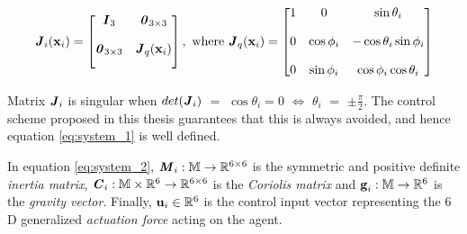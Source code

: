 \begin{equation}
  \bm{\mathit{J}}_i(\bm{\mathbf{x}}_i) =
  \begin{bmatrix}
    \bm{\mathit{I}}_3 & \bm{\mathit{0}}_{3 \times 3} \\[2.5ex]
    \bm{\mathit{0}}_{3 \times 3} & \bm{\mathit{J}}_{ q }(\bm{\mathbf{x}}_i) \\[2.5ex]
  \end{bmatrix} \notag, \text{ where }
  \bm{\mathit{J}}_q(\bm{\mathbf{x}}_i) =
  \begin{bmatrix}
    1 & 0 & \sin\theta_i \\[2.5ex]
    0 & \cos\phi_i & -\cos\theta_i \sin\phi_i \\[2.5ex]
    0 & \sin\phi_i & \cos\phi_i \cos\theta_i
  \end{bmatrix} \notag
\end{equation}

Matrix $\bm{\mathit{J}}_i$ is singular when $det(\bm{\mathit{J}}_i)$ $=$ $\cos\theta_i = 0$
$\Leftrightarrow$ $\theta_i$ $=$ $\pm \frac{\pi}{2}$. The control scheme
proposed in this thesis guarantees that this is always avoided, and hence
equation \eqref{eq:system_1} is well defined.

In equation \eqref{eq:system_2}, $\bm{\mathit{M}}_i:\mathbb{M} \to \mathbb{R}^{6\times6}$ is
the symmetric and positive definite \textit{inertia matrix},
$\bm{\mathit{C}}_i:\mathbb{M}\times\mathbb{R}^6 \to \mathbb{R}^{6\times6}$ is the
\textit{Coriolis matrix} and $\bm{\mathbf{g}}_i:\mathbb{M} \to \mathbb{R}^6$ is the
\textit{gravity vector}.
Finally, $\bm{\mathbf{u}}_i\in\mathbb{R}^6$ is the control input vector representing
the $6$D generalized \textit{actuation force} acting on the agent.




